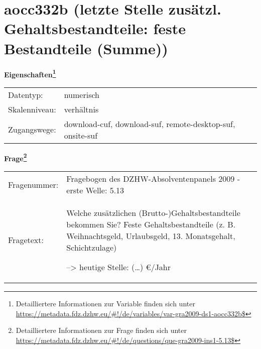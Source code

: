 
    \setcounter{footnote}{0}

    \vspace*{-1.8cm}
	\section{aocc332b (letzte Stelle zusätzl. Gehaltsbestandteile: feste Bestandteile (Summe))}
	\label{section:aocc332b}



    \vspace*{0.5cm}
    \noindent\textbf{Eigenschaften\footnote{Detailliertere Informationen zur Variable finden sich unter
		\url{https://metadata.fdz.dzhw.eu/\#!/de/variables/var-gra2009-ds1-aocc332b$}}}\\
	\begin{tabularx}{\hsize}{@{}lX}
	Datentyp: & numerisch \\
	Skalenniveau: & verhältnis \\
	Zugangswege: &
	  download-cuf, 
	  download-suf, 
	  remote-desktop-suf, 
	  onsite-suf
 \\
    \end{tabularx}



				\vspace*{0.5cm}
                \noindent\textbf{Frage\footnote{Detailliertere Informationen zur Frage finden sich unter
		              \url{https://metadata.fdz.dzhw.eu/\#!/de/questions/que-gra2009-ins1-5.13$}}}\\
				\begin{tabularx}{\hsize}{@{}lX}
					Fragenummer: &
					  Fragebogen des DZHW-Absolventenpanels 2009 - erste Welle:
					  5.13
 \\
					Fragetext: & Welche zusätzlichen (Brutto-)Gehaltsbestandteile bekommen Sie? Feste Gehaltsbestandteile (z. B. Weihnachtsgeld, Urlaubsgeld, 13. Monatsgehalt, Schichtzulage)\par  --\textgreater{} heutige Stelle: (…) €/Jahr \\
				\end{tabularx}





